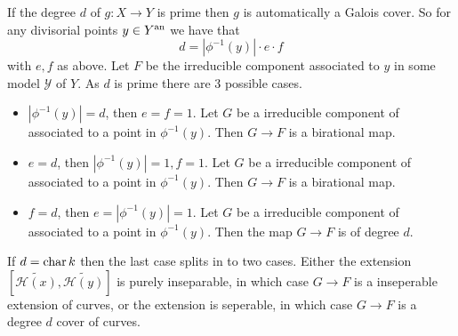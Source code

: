 \begin{remark}\label{rem:balancing_galois_cover}
	If the degree  $d$ of $g: X \to Y$ is prime then $g$ is automatically a Galois cover.
	So for any divisorial points $y \in Y{}^{\text{an}}$ we have that \[
		d = |\phi^{-1}(y)| \cdot e \cdot f
	\] 
	with $e, f$ as above. 
	Let $F$ be the irreducible component associated to $y$ in some model $\mathscr Y$ of $Y$. 
	As $d$ is prime there are 3 possible cases. 
	\begin{itemize}
		\item $|\phi^{-1}(y)| = d$, then $e = f = 1$. Let $G$ be a irreducible component of associated to a point in $\phi^{-1}(y)$. 
			Then $G \to F$ is a birational map. 
		\item $e = d$, then $|\phi^{-1}(y)| = 1, f = 1$. Let $G$ be a irreducible component of associated to a point in $\phi^{-1}(y)$. 
			Then $G \to F$ is a birational map. 
		\item $f = d$, then $e = |\phi^{-1}(y)| = 1$. Let $G$ be a irreducible component of associated to a point in $\phi^{-1}(y)$. 
			Then the map $G \to F$ is of degree $d$. 
	\end{itemize}
	If $d = \operatorname{char} k$ then the last case splits in to two cases. 
	Either the extension $\left[\widetilde{\mathcal{H} (x)}, \widetilde {\mathcal{H} (y)}\right]$ is purely inseparable, in which case $G \to F$ is a inseperable extension of curves, or the extension is seperable, in which case $G \to F$ is a degree $d$ cover of curves.
\end{remark}

